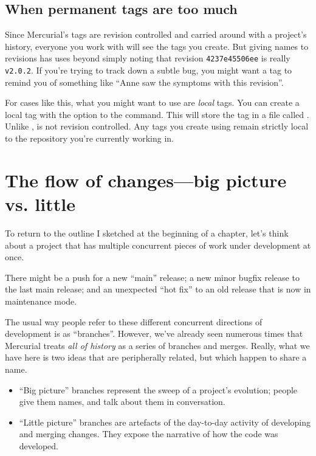 \subsection{When permanent tags are too much}

Since Mercurial's tags are revision controlled and carried around with
a project's history, everyone you work with will see the tags you
create.  But giving names to revisions has uses beyond simply noting
that revision \texttt{4237e45506ee} is really \texttt{v2.0.2}.  If
you're trying to track down a subtle bug, you might want a tag to
remind you of something like ``Anne saw the symptoms with this
revision''.

For cases like this, what you might want to use are \emph{local} tags.
You can create a local tag with the  option to the
 command.  This will store the tag in a file called
.  Unlike ,
 is not revision controlled.  Any tags you
create using  remain strictly local to the repository
you're currently working in.

\section{The flow of changes---big picture vs. little}

To return to the outline I sketched at the beginning of a chapter,
let's think about a project that has multiple concurrent pieces of
work under development at once.

There might be a push for a new ``main'' release; a new minor bugfix
release to the last main release; and an unexpected ``hot fix'' to an
old release that is now in maintenance mode.

The usual way people refer to these different concurrent directions of
development is as ``branches''.  However, we've already seen numerous
times that Mercurial treats \emph{all of history} as a series of
branches and merges.  Really, what we have here is two ideas that are
peripherally related, but which happen to share a name.
\begin{itemize}
\item ``Big picture'' branches represent the sweep of a project's
  evolution; people give them names, and talk about them in
  conversation.
\item ``Little picture'' branches are artefacts of the day-to-day
  activity of developing and merging changes.  They expose the
  narrative of how the code was developed.
\end{itemize}

